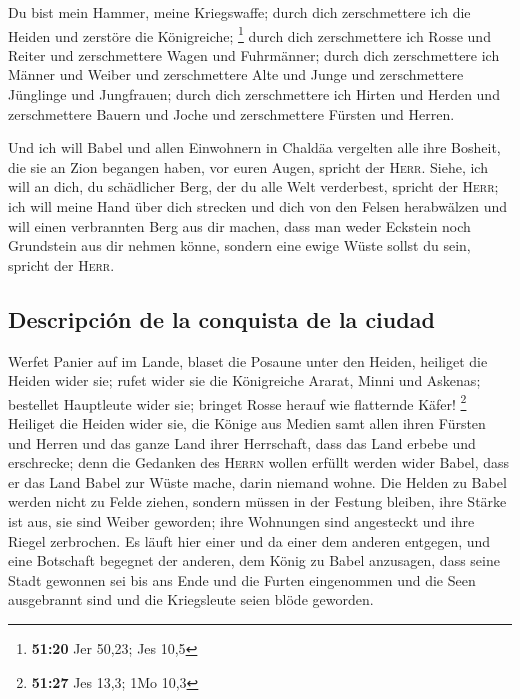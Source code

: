  Du bist mein Hammer, meine Kriegswaffe; durch dich
zerschmettere ich die Heiden und zerstöre die Königreiche; \footnote{\textbf{51:20}
  Jer 50,23; Jes 10,5}  durch dich zerschmettere ich
Rosse und Reiter und zerschmettere Wagen und Fuhrmänner; 
durch dich zerschmettere ich Männer und Weiber und zerschmettere Alte
und Junge und zerschmettere Jünglinge und Jungfrauen; 
durch dich zerschmettere ich Hirten und Herden und zerschmettere Bauern
und Joche und zerschmettere Fürsten und Herren.

 Und ich will Babel und allen Einwohnern in Chaldäa
vergelten alle ihre Bosheit, die sie an Zion begangen haben, vor euren
Augen, spricht der \textsc{Herr}.  Siehe, ich will an
dich, du schädlicher Berg, der du alle Welt verderbest, spricht der
\textsc{Herr}; ich will meine Hand über dich strecken und dich von den
Felsen herabwälzen und will einen verbrannten Berg aus dir machen,
 dass man weder Eckstein noch Grundstein aus dir nehmen
könne, sondern eine ewige Wüste sollst du sein, spricht der
\textsc{Herr}.

\hypertarget{descripciuxf3n-de-la-conquista-de-la-ciudad}{%
\subsection{Descripción de la conquista de la
ciudad}\label{descripciuxf3n-de-la-conquista-de-la-ciudad}}

 Werfet Panier auf im Lande, blaset die Posaune unter den
Heiden, heiliget die Heiden wider sie; rufet wider sie die Königreiche
Ararat, Minni und Askenas; bestellet Hauptleute wider sie; bringet Rosse
herauf wie flatternde Käfer! \footnote{\textbf{51:27} Jes 13,3; 1Mo 10,3}
 Heiliget die Heiden wider sie, die Könige aus Medien
samt allen ihren Fürsten und Herren und das ganze Land ihrer Herrschaft,
 dass das Land erbebe und erschrecke; denn die Gedanken
des \textsc{Herrn} wollen erfüllt werden wider Babel, dass er das Land
Babel zur Wüste mache, darin niemand wohne.  Die Helden
zu Babel werden nicht zu Felde ziehen, sondern müssen in der Festung
bleiben, ihre Stärke ist aus, sie sind Weiber geworden; ihre Wohnungen
sind angesteckt und ihre Riegel zerbrochen.  Es läuft
hier einer und da einer dem anderen entgegen, und eine Botschaft
begegnet der anderen, dem König zu Babel anzusagen, dass seine Stadt
gewonnen sei bis ans Ende  und die Furten eingenommen und
die Seen ausgebrannt sind und die Kriegsleute seien blöde geworden.

